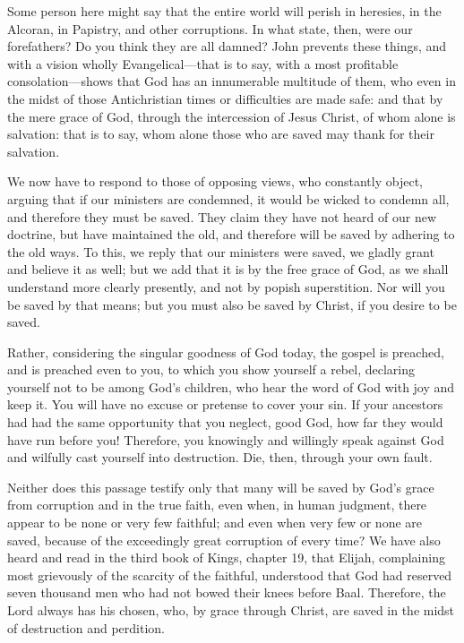 Some person here might say that the entire world will perish in heresies, in the Alcoran, in Papistry, and other corruptions. In what state, then, were our forefathers? Do you think they are all damned? John prevents these things, and with a vision wholly Evangelical—that is to say, with a most profitable consolation—shows that God has an innumerable multitude of them, who even in the midst of those Antichristian times or difficulties are made safe: and that by the mere grace of God, through the intercession of Jesus Christ, of whom alone is salvation: that is to say, whom alone those who are saved may thank for their salvation.

We now have to respond to those of opposing views, who constantly object, arguing that if our ministers are condemned, it would be wicked to condemn all, and therefore they must be saved. They claim they have not heard of our new doctrine, but have maintained the old, and therefore will be saved by adhering to the old ways. To this, we reply that our ministers were saved, we gladly grant and believe it as well; but we add that it is by the free grace of God, as we shall understand more clearly presently, and not by popish superstition. Nor will you be saved by that means; but you must also be saved by Christ, if you desire to be saved.

Rather, considering the singular goodness of God today, the gospel is preached, and is preached even to you, to which you show yourself a rebel, declaring yourself not to be among God’s children, who hear the word of God with joy and keep it. You will have no excuse or pretense to cover your sin. If your ancestors had had the same opportunity that you neglect, good God, how far they would have run before you! Therefore, you knowingly and willingly speak against God and wilfully cast yourself into destruction. Die, then, through your own fault.

Neither does this passage testify only that many will be saved by God’s grace from corruption and in the true faith, even when, in human judgment, there appear to be none or very few faithful; and even when very few or none are saved, because of the exceedingly great corruption of every time? We have also heard and read in the third book of Kings, chapter 19, that Elijah, complaining most grievously of the scarcity of the faithful, understood that God had reserved seven thousand men who had not bowed their knees before Baal. Therefore, the Lord always has his chosen, who, by grace through Christ, are saved in the midst of destruction and perdition.

